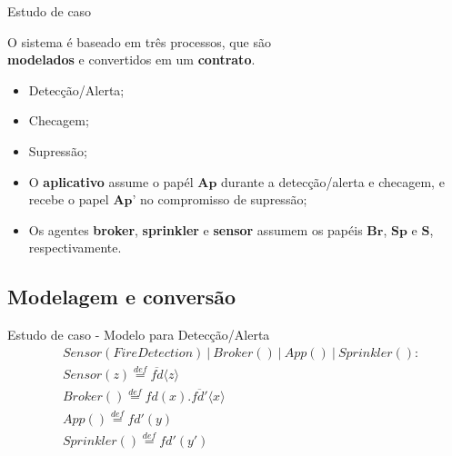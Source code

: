 \documentclass[12pt,xcolor={usenames,dvipsnames}]{beamer}
\begin{document}
\begin{frame}{Estudo de caso}
	\begin{beamerboxesrounded}{O sistema é baseado em três processos, que são \\ \textbf{modelados} e convertidos em um \textbf{contrato}.}
		\begin{itemize}
			\item Detecção/Alerta;
			\item Checagem;
			\item Supressão;
		\end{itemize}
	\end{beamerboxesrounded}
	\begin{itemize}
		\item O \textbf{aplicativo} assume o papél $\textbf{Ap}$ durante a detecção/alerta e checagem, e recebe o papel $\textbf{Ap'}$ no compromisso de supressão;
		\item Os agentes \textbf{broker}, \textbf{sprinkler} e \textbf{sensor} assumem os papéis $\textbf{Br}$, $\textbf{Sp}$ e $\textbf{S}$, respectivamente.
	\end{itemize}
\end{frame}

\subsection{Modelagem e conversão}
\begin{frame}{Estudo de caso - Modelo para Detecção/Alerta}
\begin{align}
& Sensor(FireDetection)~|~Broker()~|~App()~|~Sprinkler(): \nonumber \\
& Sensor(z) \stackrel{def}{=} \overline{fd}\langle z \rangle \nonumber \\
& Broker() \stackrel{def}{=} fd(x).\overline{fd'}\langle x \rangle \nonumber \\
& App() \stackrel{def}{=} fd'(y) \nonumber \\
& Sprinkler() \stackrel{def}{=} fd'(y') \nonumber
\end{align}
\end{frame}
\end{document}
